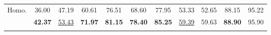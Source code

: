 \begin{table}[!htbp]
{\begin{NiceTabular}{l!{\color{black}\vrule width 0.6pt}*{10}{c}}
Homo.  & 36.00 & 47.19 & 60.61 & 76.51 & 68.60 & 77.95 & 53.33 & 52.65 & 88.15 & 95.22 \\
\Xhline{0.2pt}
 & \textbf{42.37} & \underline{53.43} & \textbf{71.97} & \textbf{81.15} & \textbf{78.40} & \textbf{85.25} & \underline{59.39} & 59.63 & \textbf{88.90} & 95.90 \\
\Xhline{1pt}
\end{NiceTabular}}
\endgroup
\end{table}